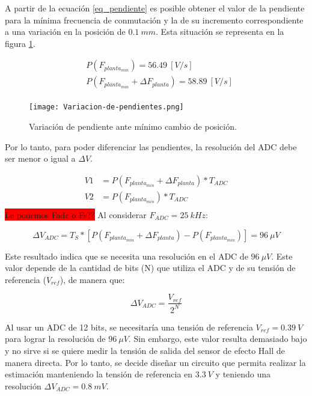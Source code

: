  A partir de la ecuación \ref{eq_pendiente} es posible obtener el valor de la pendiente para la mínima frecuencia de conmutación y la de su incremento correspondiente a una variación en la posición de $0.1\:mm$. Esta situación se representa en la figura \ref{fig:variacion-de-pendiente}.

\begin{equation} 
	\begin{aligned}
		&P(F_{planta_{min}}) = 56.49\:[V/s] \\
		&P(F_{planta_{min}} + \Delta F_{planta}) = 58.89\:[V/s] \\
	\end{aligned}
\end{equation}

\begin{figure}[H]
	\centering
	\texttt{[image: Variacion-de-pendientes.png]}
	\caption{Variación de pendiente ante mínimo cambio de posición.}
	\label{fig:variacion-de-pendiente}
\end{figure}

Por lo tanto, para poder diferenciar las pendientes, la resolución del ADC debe ser menor o igual a $\Delta V$.

\begin{equation} 
	\begin{aligned}
		V1 &= P(F_{planta_{min}} + \Delta F_{planta})* T_{ADC} \\
		V2 &= P(F_{planta_{min}})* T_{ADC} \\		 
	\end{aligned}
\end{equation}
\colorbox{red}{Le ponemos Fadc o Fs??}
 Al considerar $F_{ADC} = 25\:kHz$:

\begin{equation} 
	\Delta V_{ADC} = T_S * [P(F_{planta_{min}} + \Delta F_{planta}) - P(F_{planta_{min}})] = 96\:\mu V
\end{equation}



 Este resultado indica que se necesita una resolución en el ADC de $96\:\mu V$. Este valor depende de la cantidad de bits (N) que utiliza el ADC y de su tensión de referencia ($V_{ref}$), de manera que:
 
 \begin{equation*}
 	\Delta V_{ADC}=\frac{V_{ref}}{2^N}
 \end{equation*}

Al usar un ADC de 12 bits, se necesitaría una tensión de referencia $V_{ref} = 0.39\:V$ para lograr la resolución de $96\:\mu V$. Sin embargo, este valor resulta demasiado bajo y no sirve si se quiere medir la tensión de salida del sensor de efecto Hall de manera directa. Por lo tanto, se decide diseñar un circuito que permita realizar la estimación manteniendo la tensión de referencia en $3.3\:V$ y teniendo una resolución $\Delta V_{ADC}=0.8\:mV$.

